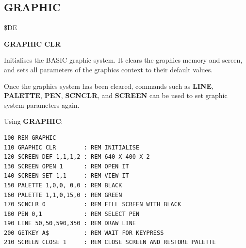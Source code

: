 \subsection{GRAPHIC}
\begin{description}[leftmargin=2cm,style=nextline]
\item [Token:] \$DE
\item [Format:] {\bf GRAPHIC CLR}
\item [Usage:] Initialises the BASIC graphic system.
               It clears the graphics memory and screen, and sets
               all parameters of the graphics context to their
               default values.

               Once the graphics system has been cleared, commands such as {\bf LINE},
               {\bf PALETTE}, {\bf PEN}, {\bf SCNCLR}, and {\bf SCREEN} can be
               used to set graphic system parameters again.

\item [Example:] Using {\bf GRAPHIC}:
\begin{tcolorbox}[colback=black,coltext=white]
\verbatimfont{\codefont}
\begin{verbatim}
100 REM GRAPHIC
110 GRAPHIC CLR        : REM INITIALISE
120 SCREEN DEF 1,1,1,2 : REM 640 X 400 X 2
130 SCREEN OPEN 1      : REM OPEN IT
140 SCREEN SET 1,1     : REM VIEW IT
150 PALETTE 1,0,0, 0,0 : REM BLACK
160 PALETTE 1,1,0,15,0 : REM GREEN
170 SCNCLR 0           : REM FILL SCREEN WITH BLACK
180 PEN 0,1            : REM SELECT PEN
190 LINE 50,50,590,350 : REM DRAW LINE
200 GETKEY A$          : REM WAIT FOR KEYPRESS
210 SCREEN CLOSE 1     : REM CLOSE SCREEN AND RESTORE PALETTE
\end{verbatim}
\end{tcolorbox}
\end{description}


\newpage
